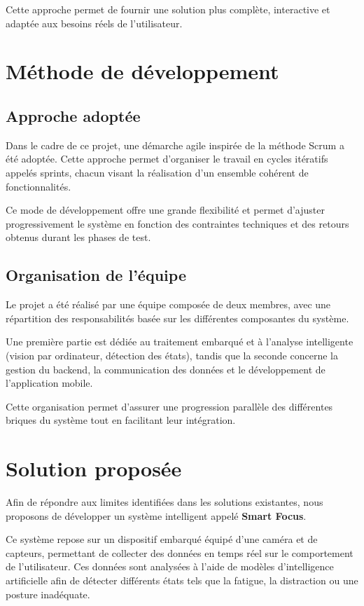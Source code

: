 \documentclass[12pt,a4paper]{report}
\begin{document}
Cette approche permet de fournir une solution plus complète, interactive et adaptée aux besoins réels de l'utilisateur.

\section{Méthode de développement}

\subsection{Approche adoptée}
Dans le cadre de ce projet, une démarche agile inspirée de la méthode Scrum a été adoptée. Cette approche permet d'organiser le travail en cycles itératifs appelés sprints, chacun visant la réalisation d'un ensemble cohérent de fonctionnalités.

Ce mode de développement offre une grande flexibilité et permet d'ajuster progressivement le système en fonction des contraintes techniques et des retours obtenus durant les phases de test.

\subsection{Organisation de l'équipe}
Le projet a été réalisé par une équipe composée de deux membres, avec une répartition des responsabilités basée sur les différentes composantes du système.

Une première partie est dédiée au traitement embarqué et à l'analyse intelligente (vision par ordinateur, détection des états), tandis que la seconde concerne la gestion du backend, la communication des données et le développement de l'application mobile.

Cette organisation permet d'assurer une progression parallèle des différentes briques du système tout en facilitant leur intégration.

\section{Solution proposée}
\label{sec:solution}

Afin de répondre aux limites identifiées dans les solutions existantes, nous proposons de développer un système intelligent appelé \textbf{Smart Focus}.

Ce système repose sur un dispositif embarqué équipé d'une caméra et de capteurs, permettant de collecter des données en temps réel sur le comportement de l'utilisateur. Ces données sont analysées à l'aide de modèles d'intelligence artificielle afin de détecter différents états tels que la fatigue, la distraction ou une posture inadéquate.
\end{document}

